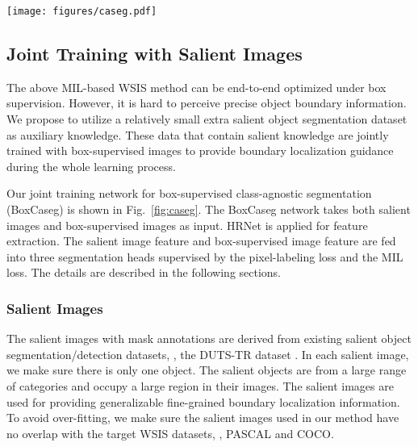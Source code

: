 \documentclass[final]{cvpr}
\begin{document}
\begin{figure*}[ht]
\centering
\texttt{[image: figures/caseg.pdf]}
\caption{The joint training scheme for box-supervised class-agnostic object segmentation. A salient image and a box-supervised image within a mini-batch are fed into a backbone network (\ie, HRNet \cite{wang2020deep}) to extract convolutional feature maps. The weak convolutional feature map is then fed into the weak segmentation head trained with the MIL loss described in Eq.~\eqref{eq:mil}. The salient convolutional feature map is simultaneously fed into the weak segmentation head, the transferred segmentation head, and the salient segmentation head. The last two heads are fused and supervised via a pixel-labeling loss (as described in Eq.~\eqref{eq:pix}).}
\label{fig:caseg}
\end{figure*}

\subsection{Joint Training with Salient Images}\label{Sec:Joint_train}

The above MIL-based WSIS method can be end-to-end optimized under box supervision. However, it is hard to perceive precise object boundary information. We propose to utilize a relatively small extra salient object segmentation dataset as auxiliary knowledge. These data that contain salient knowledge are jointly trained with box-supervised images to provide boundary localization guidance during the whole learning process.

Our joint training network for box-supervised class-agnostic segmentation (BoxCaseg) is shown in Fig.~\ref{fig:caseg}. The BoxCaseg network takes both salient images and box-supervised images as input. HRNet \cite{wang2020deep} is applied for feature extraction. The salient image feature and box-supervised image feature are fed into three segmentation heads supervised by the pixel-labeling loss and the MIL loss. The details are described in the following sections.



\vspace{-3mm}
\subsubsection{Salient Images}
\vspace{-2mm}
The salient images with mask annotations are derived from existing salient object segmentation/detection datasets, \eg, the DUTS-TR dataset \cite{wang2017learning}. In each salient image, we make sure there is only one object. The salient objects are from a large range of categories and occupy a large region in their images. The salient images are used for providing generalizable fine-grained boundary localization information. To avoid over-fitting, we make sure the salient images used in our method have no overlap with the target WSIS datasets, \eg, PASCAL and COCO. 
\end{document}
